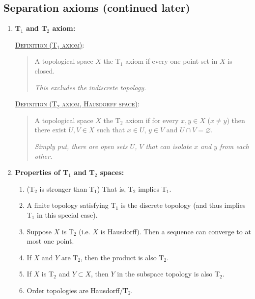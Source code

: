 \documentclass[letterpaper, 12pt]{article}
\newcommand{\Taxiom}[1]{T$_\text{#1}$}
\newcommand{\defn}[2]{\textsc{\underline{Definition (#1)}:}\begin{quote} #2\end{quote}}
\let\emptyset\varnothing
\begin{document}
    \subsection{Separation axioms (continued later)}
        \begin{enumerate}[resume]
        \item \textbf{\Taxiom{1} and \Taxiom{2} axiom:}

            \defn{\Taxiom{1} axiom}{A topological space $X$ the \Taxiom{1} axiom if every one-point set in $X$ is closed.

            \textit{This excludes the indiscrete topology.}}

            \defn{\Taxiom{2} axiom, Hausdorff space}{A topological space $X$ the \Taxiom{2} axiom if for every $x, y\in X$ ($x\ne y$) then there exist $U, V\in X$ such that $x\in U$, $y\in V$ and $U\cap V = \emptyset$.

            \textit{Simply put, there are open sets $U$, $V$ that can isolate $x$ and $y$ from each other.}}
        \item \textbf{Properties of \Taxiom{1} and \Taxiom{2} spaces:}
            \begin{enumerate}
            \item (\Taxiom{2} is stronger than \Taxiom{1}) That is, \Taxiom{2} implies \Taxiom{1}.
            \item A finite topology satisfying \Taxiom{1} is the discrete topology (and thus implies \Taxiom{1} in this special case).
            \item Suppose $X$ is \Taxiom{2} (i.e. $X$ is Hausdorff). Then a sequence can converge to at most one point.
            \item If $X$ and $Y$ are \Taxiom{2}, then the product is also \Taxiom{2}.
            \item If $X$ is \Taxiom{2} and $Y\subset X$, then $Y$ in the subspace topology is also \Taxiom{2}.
            \item Order topologies are Hausdorff/\Taxiom{2}.
            \end{enumerate}
    \end{enumerate}

\end{document}
